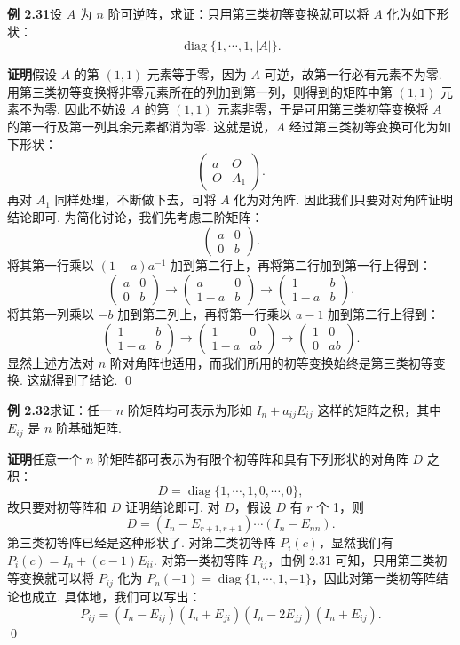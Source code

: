 \documentclass[UTF8,12pt,a4paper,fontset=fandol]{ctexart}
\begin{document}
\noindent\textbf{例 2.31}\quad 设 $A$ 为 $n$ 阶可逆阵，求证：只用第三类初等变换就可以将 $A$ 化为如下形状：
\[
\operatorname{diag}\{1,\cdots,1,|A|\}.
\]

\noindent\textbf{证明}\quad 假设 $A$ 的第 $(1,1)$ 元素等于零，因为 $A$ 可逆，故第一行必有元素不为零. 用第三类初等变换将非零元素所在的列加到第一列，则得到的矩阵中第 $(1,1)$ 元素不为零. 因此不妨设 $A$ 的第 $(1,1)$ 元素非零，于是可用第三类初等变换将 $A$ 的第一行及第一列其余元素都消为零. 这就是说，$A$ 经过第三类初等变换可化为如下形状：
\[
\left(
\begin{array}{cc}
a & O\\
O & A_1
\end{array}
\right).
\]
再对 $A_1$ 同样处理，不断做下去，可将 $A$ 化为对角阵. 因此我们只要对对角阵证明结论即可. 为简化讨论，我们先考虑二阶矩阵：
\[
\left(
\begin{array}{cc}
a & 0\\
0 & b
\end{array}
\right).
\]
将其第一行乘以 $(1-a)a^{-1}$ 加到第二行上，再将第二行加到第一行上得到：
\[
\left(
\begin{array}{cc}
a & 0\\
0 & b
\end{array}
\right)
\to
\left(
\begin{array}{cc}
a & 0\\
1-a & b
\end{array}
\right)
\to
\left(
\begin{array}{cc}
1 & b\\
1-a & b
\end{array}
\right).
\]
将其第一列乘以 $-b$ 加到第二列上，再将第一行乘以 $a-1$ 加到第二行上得到：
\[
\left(
\begin{array}{cc}
1 & b\\
1-a & b
\end{array}
\right)
\to
\left(
\begin{array}{cc}
1 & 0\\
1-a & ab
\end{array}
\right)
\to
\left(
\begin{array}{cc}
1 & 0\\
0 & ab
\end{array}
\right).
\]
显然上述方法对 $n$ 阶对角阵也适用，而我们所用的初等变换始终是第三类初等变换. 这就得到了结论. \qed

\noindent\textbf{例 2.32}\quad 求证：任一 $n$ 阶矩阵均可表示为形如 $I_n+a_{ij}E_{ij}$ 这样的矩阵之积，其中 $E_{ij}$ 是 $n$ 阶基础矩阵.

\noindent\textbf{证明}\quad 任意一个 $n$ 阶矩阵都可表示为有限个初等阵和具有下列形状的对角阵 $D$ 之积：
\[
D=\operatorname{diag}\{1,\cdots,1,0,\cdots,0\},
\]
故只要对初等阵和 $D$ 证明结论即可. 对 $D$，假设 $D$ 有 $r$ 个 1，则
\[
D=(I_n-E_{r+1,r+1})\cdots(I_n-E_{nn}).
\]
第三类初等阵已经是这种形状了. 对第二类初等阵 $P_i(c)$，显然我们有 $P_i(c)=I_n+(c-1)E_{ii}$. 对第一类初等阵 $P_{ij}$，由例 2.31 可知，只用第三类初等变换就可以将 $P_{ij}$ 化为 $P_n(-1)=\operatorname{diag}\{1,\cdots,1,-1\}$，因此对第一类初等阵结论也成立. 具体地，我们可以写出：
\[
P_{ij}=(I_n-E_{ij})(I_n+E_{ji})(I_n-2E_{jj})(I_n+E_{ij}).
\]
\qed
\end{document}
